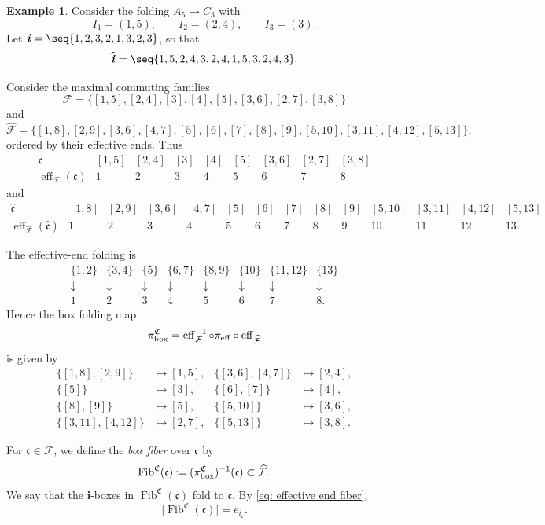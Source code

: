\documentclass[12pt, leqno]{amsart}
\numberwithin{equation}{section}
\theoremstyle{plain}
\theoremstyle{definition}
\newtheorem{example}[lemma]{Example}
\newcommand{\seteq}{\mathbin{:=}}
\newcommand{\bx}{{\rm box}}
\newcommand{\ii}{ \textbf{\textit{i}}}
\newcommand{\Fib}{\operatorname{Fib}}
\newcommand{\eff}{\operatorname{eff}}
\newcommand{\hii}{{\widehat{\ii}}}
\newcommand{\frakC}{\mathfrak{C}}
\newcommand{\frakc}{\mathfrak{c}}
\newcommand{\hfrakc}{\widehat{\frakc}}
\newcommand{\bfi}{\mathbf{i}}
\newcommand{\calF}{\mathcal{F}}
\newcommand{\hcalF}{{\widehat{\calF}}}
\begin{document}
\begin{example}\label{ex: box folding A5 C3}
Consider the folding $A_5\to C_3$ with
\[
I_1=(1,5),\qquad I_2=(2,4),\qquad I_3=(3).
\]
Let $\ii=\seq{1,2,3,2,1,3,2,3}$,
so that
\[
\hii=\seq{1,5,2,4,3,2,4,1,5,3,2,4,3}.
\]

Consider the maximal commuting families
\[
\calF=
\{[1,5],[2,4],[3],[4], [5],[3,6],[2,7],[3,8] \}
\]
and
\[
\hcalF= \{ [1,8],[2,9],[3,6],[4,7],[5],[6],[7], [8],[9],[5,10],[3,11],[4,12],[5,13] \},
\]
ordered by their effective ends. Thus
\[
\begin{array}{c|cccccccc}
\frakc
&[1,5]&[2,4]&[3]&[4]&[5]&[3,6]&[2,7]&[3,8]\\
\hline
\eff_\calF(\frakc)
&1&2&3&4&5&6&7&8
\end{array}
\]
and
\[
\begin{array}{c|ccccccccccccc}
\hfrakc
&[1,8]&[2,9]&[3,6]&[4,7]&[5]&[6]&[7]
&[8]&[9]&[5,10]&[3,11]&[4,12]&[5,13]\\
\hline
\eff_{\hcalF}(\hfrakc)
&1&2&3&4&5&6&7&8&9&10&11&12&13 .
\end{array}
\]

The effective-end folding is
\[
\begin{array}{cccccccc}
\{1,2\}&\{3,4\}&\{5\}&\{6,7\}&
\{8,9\}&\{10\}&\{11,12\}&\{13\}\\
\downarrow&\downarrow&\downarrow&\downarrow&
\downarrow&\downarrow&\downarrow&\downarrow\\
1&2&3&4&5&6&7&8 .
\end{array}
\]
Hence the box folding map
\[
\pi_{\bx}^{\frakC}
=
\eff_\calF^{-1}\circ\pi_{\eff}\circ\eff_{\hcalF}
\]
is given by
\[
\begin{aligned}
\{[1,8],[2,9]\}&\longmapsto[1,5],&
\{[3,6],[4,7]\}&\longmapsto[2,4],\\
\{[5]\}&\longmapsto[3],&
\{[6],[7]\}&\longmapsto[4],\\
\{[8],[9]\}&\longmapsto[5],&
\{[5,10]\}&\longmapsto[3,6],\\
\{[3,11],[4,12]\}&\longmapsto[2,7],&
\{[5,13]\}&\longmapsto[3,8].
\end{aligned}
\]
\end{example}

For $\frakc\in\calF$, we define the \emph{box fiber} over $\frakc$ by
\[
\Fib^{\frakC}(\frakc) \seteq (\pi_{\bx}^{\frakC})^{-1}(\frakc)
\subset\hcalF.
\]
We say that the $\bfi$-boxes in $\Fib^{\frakC}(\frakc)$ fold to $\frakc$. By \eqref{eq: effective end fiber},
\[
\bigl|\Fib^{\frakC}(\frakc)\bigr|=e_{i_{\frakc}}.
\]
\end{document}

